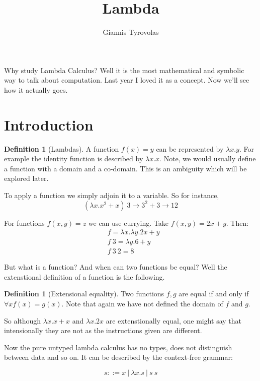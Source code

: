 \documentclass[11pt,a4paper]{article}
\title{Lambda}
\author{Giannis Tyrovolas}
\theoremstyle{definition}
\newtheorem{definition}[theorem]{Definition}
\begin{document}
\maketitle


Why study Lambda Calculus? Well it is the most mathematical and symbolic way to talk about computation. Last year I loved it as a concept. Now we'll see how it actually goes.

\section{Introduction}

\begin{definition}[Lambdas]
A function $f(x) = y$ can be represented by $\lambda x.y$. For example the identity function is described by $\lambda x.x$. Note, we would usually define a function with a domain and a co-domain. This is an ambiguity which will be explored later.
\end{definition}

To apply a function we simply adjoin it to a variable. So for instance, 
\[
(\lambda x. x^2 + x) \  3 \rightarrow 3^2 + 3 \rightarrow 12	
\]

For functions $f(x,y) = z$ we can use currying. Take $f(x,y) = 2x + y$. Then:
\begin{align*}
    &f = \lambda x. \lambda y. 2x + y \\
	&f \ 3 = \lambda y. 6 + y \\
	&f \ 3 \ 2 = 8
\end{align*}
	
But what is a function? And when can two functions be equal? Well the extenstional definition of a function is the following.

\begin{definition}[Extensional equality]
Two functions $f, g$ are equal if and only if $\forall x f(x) = g(x)$. Note that again we have not defined the domain of $f$ and $g$. 
\end{definition}

So although $\lambda x. x + x$ and $\lambda x. 2x$ are extenstionally equal, one might say that intensionally they are not as the instructions given are different.

Now the pure untyped lambda calculus has no types, does not distinguish between data and so on. It can be described by the context-free grammar: 

\[
	s ::= x \ | \ \lambda x.s \ | \ s \ s
\]
\end{document}
